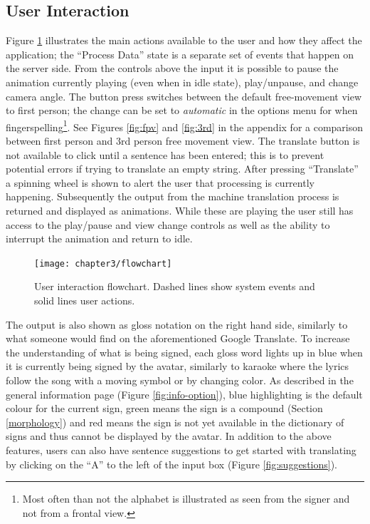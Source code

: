 \documentclass[12pt]{ociamthesis}  %
\begin{document}
\subsection{User Interaction}
Figure \ref{fig:flow} illustrates the main actions available to the user and how they affect the application; the ``Process Data'' state is a separate set of events that happen on the server side. From the controls above the input it is possible to pause the animation currently playing (even when in idle state), play/unpause, and change camera angle. The button press switches between the default free-movement view to first person; the change can be set to \textit{automatic} in the options menu for when fingerspelling\footnote{Most often than not the alphabet is illustrated as seen from the signer and not from a frontal view.}. See Figures \ref{fig:fpv} and \ref{fig:3rd} in the appendix for a comparison between first person and 3rd person free movement view. The translate button is not available to click until a sentence has been entered; this is to prevent potential errors if trying to translate an empty string. After pressing ``Translate'' a spinning wheel is shown to alert the user that processing is currently happening. Subsequently the output from the machine translation process is returned and displayed as animations. While these are playing the user still has access to the play/pause and view change controls as well as the ability to interrupt the animation and return to idle.
\begin{figure}[H]
	\centering
    \texttt{[image: chapter3/flowchart]}
    \caption[User interaction flowchart]{User interaction flowchart. Dashed lines show system events and solid lines user actions.}
    \label{fig:flow}
\end{figure}
The output is also shown as gloss notation on the right hand side, similarly to what someone would find on the aforementioned Google Translate. To increase the understanding of what is being signed, each gloss word lights up in blue when it is currently being signed by the avatar, similarly to karaoke where the lyrics follow the song with a moving symbol or by changing color. As described in the general information page (Figure \ref{fig:info-option}), blue highlighting is the default colour for the current sign, green means the sign is a compound (Section \ref{morphology}) and red means the sign is not yet available in the dictionary of signs and thus cannot be displayed by the avatar.
In addition to the above features, users can also have sentence suggestions to get started with translating by clicking on the ``A'' to the left of the input box (Figure \ref{fig:suggestions}). 
\end{document}
